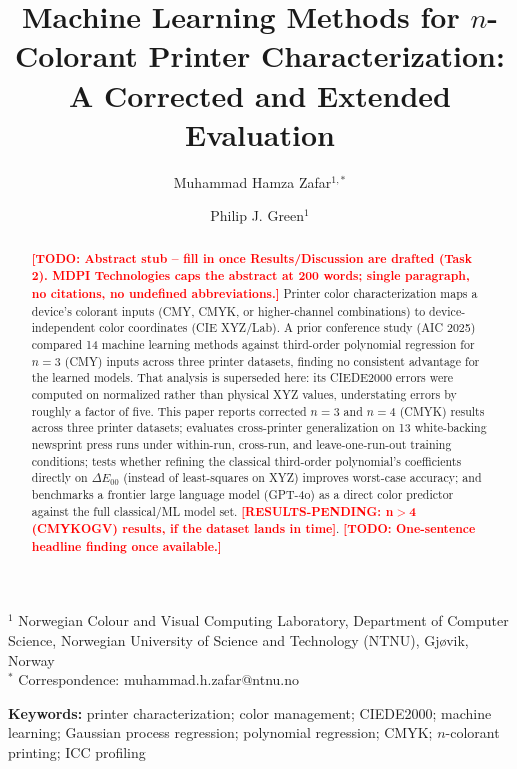 \documentclass[11pt,a4paper]{article}
\title{\Large Machine Learning Methods for $n$-Colorant Printer Characterization: A Corrected and Extended Evaluation}
\author{
  Muhammad Hamza Zafar$^{1,*}$ \and Philip J. Green$^{1}$
}
\date{}
\newcommand{\todonote}[1]{\textcolor{red}{\textbf{[TODO: #1]}}}
\newcommand{\respending}[1]{\textcolor{red}{\textbf{[RESULTS-PENDING: #1]}}}
\begin{document}
\maketitle

\noindent
$^{1}$ Norwegian Colour and Visual Computing Laboratory, Department of Computer Science,
Norwegian University of Science and Technology (NTNU), Gjøvik, Norway\\
$^{*}$ Correspondence: muhammad.h.zafar@ntnu.no


\begin{abstract}
\noindent
\todonote{Abstract stub -- fill in once Results/Discussion are drafted (Task 2).
MDPI Technologies caps the abstract at 200 words; single paragraph, no
citations, no undefined abbreviations.}
Printer color characterization maps a device's colorant inputs (CMY, CMYK, or
higher-channel combinations) to device-independent color coordinates (CIE
XYZ/Lab). A prior conference study (AIC 2025) compared 14 machine learning
methods against third-order polynomial regression for $n=3$ (CMY) inputs
across three printer datasets, finding no consistent advantage for the
learned models. That analysis is superseded here: its CIEDE2000 errors were
computed on normalized rather than physical XYZ values, understating errors
by roughly a factor of five. This paper reports corrected $n=3$ and $n=4$
(CMYK) results across three printer datasets; evaluates cross-printer
generalization on 13 white-backing newsprint press runs under within-run,
cross-run, and leave-one-run-out training conditions; tests whether refining
the classical third-order polynomial's coefficients directly on
$\Delta E_{00}$ (instead of least-squares on XYZ) improves worst-case
accuracy; and benchmarks a frontier large language model (GPT-4o) as a
direct color predictor against the full classical/ML model set.
\respending{n$>$4 (CMYKOGV) results, if the dataset lands in time}.
\todonote{One-sentence headline finding once available.}
\end{abstract}

\textbf{Keywords:} printer characterization; color management; CIEDE2000;
machine learning; Gaussian process regression; polynomial regression;
CMYK; $n$-colorant printing; ICC profiling
\end{document}
